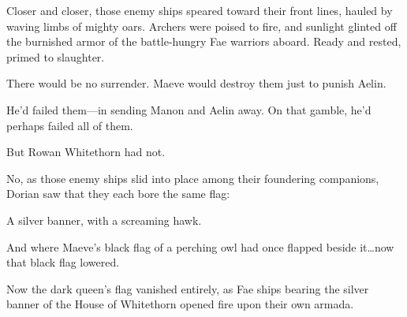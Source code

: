 Closer and closer, those enemy ships speared toward their front lines, hauled by waving limbs of mighty oars.
Archers were poised to fire, and sunlight glinted off the burnished armor of the battle-hungry Fae warriors aboard.
Ready and rested, primed to slaughter.

There would be no surrender.
Maeve would destroy them just to punish Aelin.

He'd failed them---in sending Manon and Aelin away.
On that gamble, he'd perhaps failed all of them.

But Rowan Whitethorn had not.

No, as those enemy ships slid into place among their foundering companions, Dorian saw that they each bore the same flag:

A silver banner, with a screaming hawk.

And where Maeve's black flag of a perching owl had once flapped beside it\ldots now that black flag lowered.

Now the dark queen's flag vanished entirely, as Fae ships bearing the silver banner of the House of Whitethorn opened fire upon their own armada.
